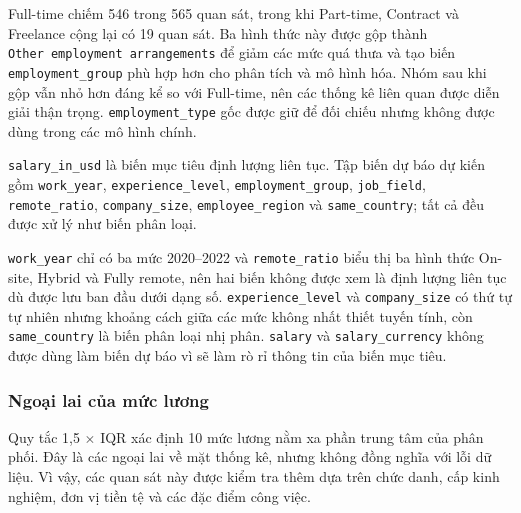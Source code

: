 Full-time chiếm 546 trong 565 quan sát, trong khi Part-time, Contract và
Freelance cộng lại có 19 quan sát. Ba hình thức này được gộp thành
\texttt{Other\ employment\ arrangements} để giảm các mức quá thưa và tạo
biến \texttt{employment\_group} phù hợp hơn cho phân tích và mô hình
hóa. Nhóm sau khi gộp vẫn nhỏ hơn đáng kể so với Full-time, nên các
thống kê liên quan được diễn giải thận trọng. \texttt{employment\_type}
gốc được giữ để đối chiếu nhưng không được dùng trong các mô hình chính.

\texttt{salary\_in\_usd} là biến mục tiêu định lượng liên tục. Tập biến
dự báo dự kiến gồm \texttt{work\_year}, \texttt{experience\_level},
\texttt{employment\_group}, \texttt{job\_field}, \texttt{remote\_ratio},
\texttt{company\_size}, \texttt{employee\_region} và
\texttt{same\_country}; tất cả đều được xử lý như biến phân loại.

\texttt{work\_year} chỉ có ba mức 2020--2022 và \texttt{remote\_ratio}
biểu thị ba hình thức On-site, Hybrid và Fully remote, nên hai biến
không được xem là định lượng liên tục dù được lưu ban đầu dưới dạng số.
\texttt{experience\_level} và \texttt{company\_size} có thứ tự tự nhiên
nhưng khoảng cách giữa các mức không nhất thiết tuyến tính, còn
\texttt{same\_country} là biến phân loại nhị phân. \texttt{salary} và
\texttt{salary\_currency} không được dùng làm biến dự báo vì sẽ làm rò
rỉ thông tin của biến mục tiêu.

\subsubsection{Ngoại lai của mức
lương}\label{nghi:ngoux1ea1i-lai-cux1ee7a-mux1ee9c-lux1b0ux1a1ng}

Quy tắc 1,5 \(\times\) IQR xác định 10 mức lương nằm xa phần trung tâm của phân
phối. Đây là các ngoại lai về mặt thống kê, nhưng không đồng nghĩa với
lỗi dữ liệu. Vì vậy, các quan sát này được kiểm tra thêm dựa trên chức
danh, cấp kinh nghiệm, đơn vị tiền tệ và các đặc điểm công việc.


